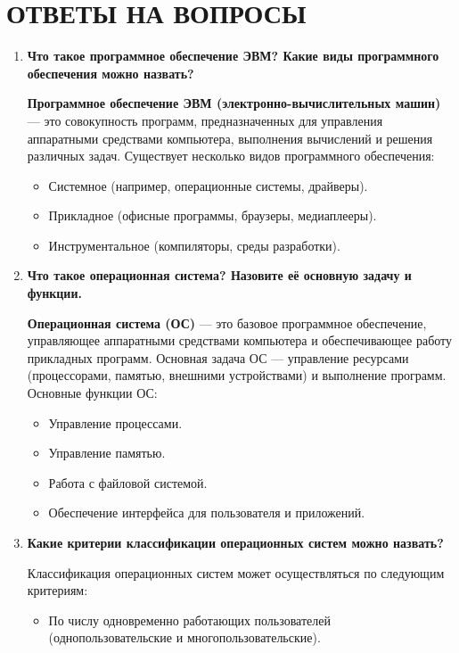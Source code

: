 \section*{\LARGE ОТВЕТЫ НА ВОПРОСЫ}

\begin{enumerate}
	\item \textbf{Что такое программное обеспечение ЭВМ?
		Какие виды программного обеспечения можно назвать?}\par
		\textbf{Программное обеспечение ЭВМ (электронно-вычислительных машин)}
		--- это совокупность программ,
		предназначенных для управления аппаратными средствами компьютера,
		выполнения вычислений и решения различных задач.
		Существует несколько видов программного обеспечения:
		\begin{itemize}
			\item Системное (например, операционные системы, драйверы).
			\item Прикладное (офисные программы, браузеры, медиаплееры).
			\item Инструментальное (компиляторы, среды разработки).
		\end{itemize}
	\item \textbf{Что такое операционная система?
		Назовите её основную задачу и функции.}\par
		\textbf{Операционная система (ОС)} --- это базовое программное
		обеспечение, управляющее аппаратными средствами компьютера
		и обеспечивающее работу прикладных программ.
		Основная задача ОС --- управление ресурсами
		(процессорами, памятью, внешними устройствами) и выполнение программ.
		Основные функции ОС:
		\begin{itemize}
			\item Управление процессами.
			\item Управление памятью.
			\item Работа с файловой системой.
			\item Обеспечение интерфейса для пользователя и приложений.
		\end{itemize}
	\item \textbf{Какие критерии классификации операционных
			систем можно назвать?}\par
		Классификация операционных систем может осуществляться
		по следующим критериям:
		\begin{itemize}
			\item По числу одновременно работающих пользователей
				(однопользовательские и многопользовательские).

\end{itemize}
\end{enumerate}

